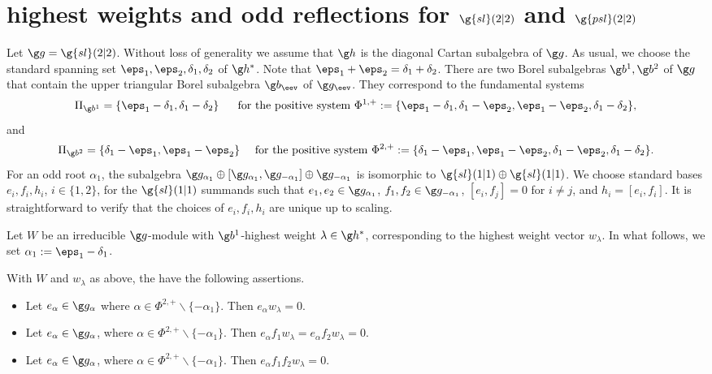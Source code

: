 \documentclass[12pt]{amsart}
\begin{document}
\section{highest weights and  odd reflections for $\g{sl}(2|2)$ and $\g{psl}(2|2)$}
\label{App-sl22}
Let $\g g=\g{sl}(2|2)$. Without loss of generality we assume that $\g h$ is the diagonal Cartan subalgebra of $\g g$. As usual,  we choose the standard spanning set $\eps_1,\eps_2,\delta_1,\delta_2$ of $\g h^*$. Note that $\eps_1+\eps_2=\delta_1+\delta_2$.   There are two Borel subalgebras $\g b^1,\g b^2$ of $\g g$ that contain the upper triangular Borel subalgebra $\g b_\eev$ of $\g g_\eev$. They correspond to the fundamental systems 
\[
\Pi_{\g b^1}=\{\eps_1-\delta_1,\delta_1-\delta_2\}\
\quad\text{ for the positive system }
\Phi^{1,+}:=\{
\eps_1-\delta_1,\delta_1-\eps_2,\eps_1-\eps_2, \delta_1-\delta_2
\},\] and 
\[\Pi_{\g b^2}=\{\delta_1-\eps_1,\eps_1-\eps_2\}
\quad\text{ for the positive system }
\Phi^{2,+}:=\{\delta_1-\eps_1, \eps_1-\eps_2, \delta_1-\eps_2,\delta_1-\delta_2
\}.\]
For an odd root $\alpha_1$,   the subalgebra $\g g_{\alpha_1}\oplus[\g g_{\alpha_1},\g g_{-\alpha_1}]\oplus\g g_{-\alpha_1}$ is isomorphic to $\g{sl}(1|1)\oplus\g{sl}(1|1)$.  We choose standard bases $e_i,f_i,h_i$, $i\in\{1,2\}$, for the $\g{sl}(1|1)$ summands such that $e_1,e_2\in\g g_{\alpha_1}$,  $f_1,f_2\in\g g_{-\alpha_1}$, $[e_i,f_j]=0$ for $i\neq j$, and  $h_i=[e_i,f_i]$. It is straightforward to verify that the choices of $e_i,f_i,h_i$ are unique up to scaling. 

Let $W$ be an irreducible $\g g$-module with $\g b^1$-highest weight $\lambda\in\g h^*$, corresponding to the highest weight vector $w_\lambda$. In what follows, we set $\alpha_1:=\eps_1-\delta_1$.
\begin{lem}
With $W$ and $w_\lambda$ as above, the have the following assertions.
\label{lem:B1}
\begin{itemize} 
\item[\rm (i)]
Let $e_{\alpha}\in \g g_{\alpha}$ where $\alpha\in\Phi^{2,+}\backslash \{-\alpha_1\}$.
Then  $e_{\alpha} w_\lambda=0$.

\item[\rm (ii)]  Let  $e_\alpha\in \g g_\alpha$, where $\alpha\in\Phi^{2,+}\backslash \{-\alpha_1\}$. Then 
$e_\alpha f_1w_\lambda=e_\alpha f_2w_\lambda=0$. 

\item[\rm (iii)]  Let 
 $e_\alpha\in \g g_\alpha$, where $\alpha\in\Phi^{2,+}\backslash \{-\alpha_1\}$. Then 
$e_\alpha f_1f_2w_\lambda=0$. 
\end{itemize}
\end{lem}
\end{document}
